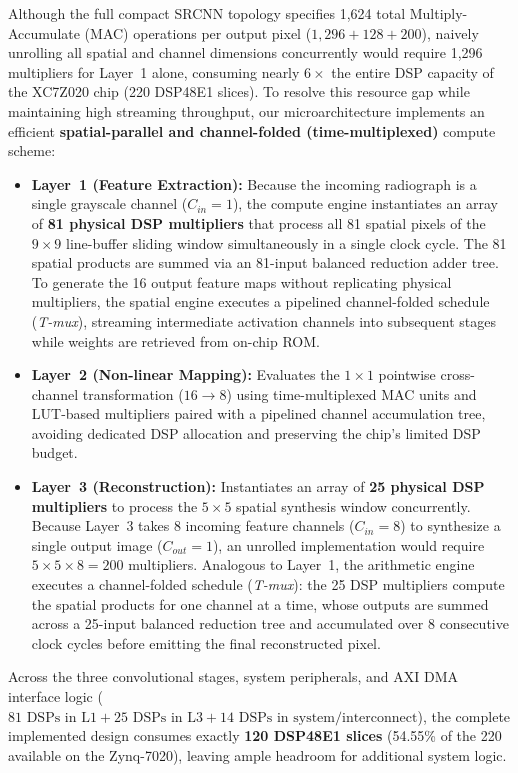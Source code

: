 \documentclass[conference]{IEEEtran}
\begin{document}
Although the full compact SRCNN topology specifies 1,624 total Multiply-Accumulate (MAC) operations per output pixel ($1,296 + 128 + 200$), naively unrolling all spatial and channel dimensions concurrently would require 1,296 multipliers for Layer~1 alone, consuming nearly $6 \times$ the entire DSP capacity of the XC7Z020 chip (220 DSP48E1 slices). To resolve this resource gap while maintaining high streaming throughput, our microarchitecture implements an efficient \textbf{spatial-parallel and channel-folded (time-multiplexed)} compute scheme:
\begin{itemize}
    \item \textbf{Layer~1 (Feature Extraction):} Because the incoming radiograph is a single grayscale channel ($C_{in} = 1$), the compute engine instantiates an array of \textbf{81 physical DSP multipliers} that process all 81 spatial pixels of the $9 \times 9$ line-buffer sliding window simultaneously in a single clock cycle. The 81 spatial products are summed via an 81-input balanced reduction adder tree. To generate the 16 output feature maps without replicating physical multipliers, the spatial engine executes a pipelined channel-folded schedule (\textit{T-mux}), streaming intermediate activation channels into subsequent stages while weights are retrieved from on-chip ROM.
    \item \textbf{Layer~2 (Non-linear Mapping):} Evaluates the $1 \times 1$ pointwise cross-channel transformation ($16 \rightarrow 8$) using time-multiplexed MAC units and LUT-based multipliers paired with a pipelined channel accumulation tree, avoiding dedicated DSP allocation and preserving the chip's limited DSP budget.
    \item \textbf{Layer~3 (Reconstruction):} Instantiates an array of \textbf{25 physical DSP multipliers} to process the $5 \times 5$ spatial synthesis window concurrently. Because Layer~3 takes 8 incoming feature channels ($C_{in} = 8$) to synthesize a single output image ($C_{out} = 1$), an unrolled implementation would require $5 \times 5 \times 8 = 200$ multipliers. Analogous to Layer~1, the arithmetic engine executes a channel-folded schedule (\textit{T-mux}): the 25 DSP multipliers compute the spatial products for one channel at a time, whose outputs are summed across a 25-input balanced reduction tree and accumulated over 8 consecutive clock cycles before emitting the final reconstructed pixel.
\end{itemize}
Across the three convolutional stages, system peripherals, and AXI DMA interface logic ($81\text{ DSPs in L1} + 25\text{ DSPs in L3} + 14\text{ DSPs in system/interconnect}$), the complete implemented design consumes exactly \textbf{120 DSP48E1 slices} (54.55\% of the 220 available on the Zynq-7020), leaving ample headroom for additional system logic.
\end{document}
